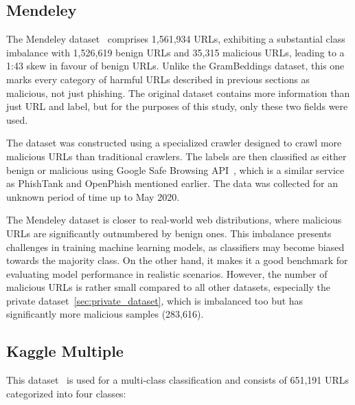 \subsection{Mendeley}
The Mendeley dataset~\cite{Singh2020Mendeley} comprises 1,561,934 URLs, exhibiting a substantial class imbalance with 1,526,619 benign URLs and 35,315 malicious URLs, leading to a 1:43 skew in favour of benign URLs. Unlike the GramBeddings dataset, this one marks every category of harmful URLs described in previous sections as malicious, not just phishing. The original dataset contains more information than just URL and label, but for the purposes of this study, only these two fields were used.

The dataset was constructed using a specialized crawler designed to crawl more malicious URLs than traditional crawlers. The labels are then classified as either benign or malicious using Google Safe Browsing API~\cite{GoogleSafeBrowsing}, which is a similar service as PhishTank and OpenPhish mentioned earlier. The data was collected for an unknown period of time up to May 2020.

The Mendeley dataset is closer to real-world web distributions, where malicious URLs are significantly outnumbered by benign ones. This imbalance presents challenges in training machine learning models, as classifiers may become biased towards the majority class. On the other hand, it makes it a good benchmark for evaluating model performance in realistic scenarios. However, the number of malicious URLs is rather small compared to all other datasets, especially the private dataset~\ref{sec:private_dataset}, which is imbalanced too but has significantly more malicious samples (283,616).

\subsection{Kaggle Multiple}
This dataset~\cite{SiddharthaMaliciousURLs} is used for a multi-class classification and consists of 651,191 URLs categorized into four classes:

